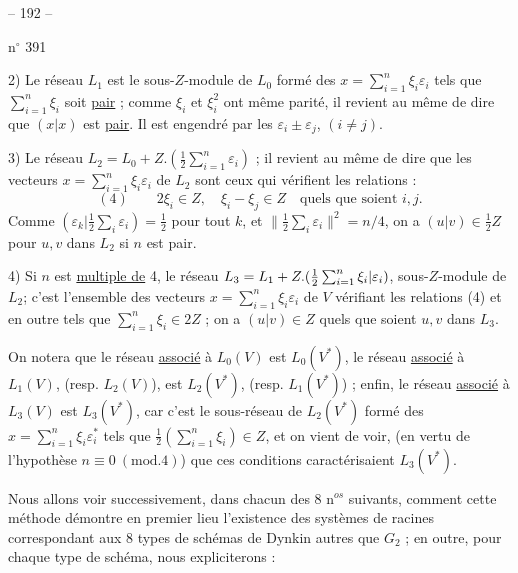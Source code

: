 
\begin{center}-- 192 --\end{center}
\hfill n$^{\circ}$ 391

2) Le réseau $L_1$ est le sous-$Z$-module de $L_0$ formé des $x=\sum_{i=1}^n\xi_i\varepsilon_i$ tels que
$\sum_{i=1}^n\xi_i$ soit \uline{pair} ; comme $\xi_i$ et $\xi_i^2$ ont même parité, il revient au même de dire
que $(x|x)$ est \uline{pair}. Il est engendré par les $\varepsilon_i\pm\varepsilon_j$, $(i\ne j)$.

3) Le réseau $L_2=L_0+Z.(\frac12\sum_{i=1}^n\varepsilon_i)$ ; il revient au même de dire que les vecteurs
$x=\sum_{i=1}^n\xi_i\varepsilon_i$ de $L_2$ sont ceux qui vérifient les relations :
\[
(4)\qquad 2\xi_i\in Z,\quad \xi_i-\xi_j\in Z\quad\text{quels que soient }i,j.
\]
Comme $(\varepsilon_k|\frac12\sum_i\varepsilon_i)=\frac12$ pour tout $k$, et
$\|\frac12\sum_i\varepsilon_i\|^2=n/4$, on a $(u|v)\in\frac12 Z$
pour $u,v$ dans $L_2$ si $n$ est pair.

4) Si $n$ est \uline{multiple de} 4, le réseau $L_3=L_1+Z.(\frac12\sum_{i=1}^n{\xi_i|\varepsilon_i})$, sous-$Z$-module de $L_2$;
c'est l'ensemble des vecteurs $x=\sum_{i=1}^n\xi_i\varepsilon_i$ de $V$ vérifiant les relations (4) et
en outre tels que $\sum_{i=1}^n\xi_i\in 2Z$ ; on a $(u|v)\in Z$ quels que soient $u,v$ dans $L_3$.

On notera que le réseau \uline{associé} à $L_0(V)$ est $L_0(V^*)$, le réseau \uline{associé}
à $L_1(V)$, (resp. $L_2(V)$), est $L_2(V^*)$, (resp. $L_1(V^*)$) ; enfin, le réseau \uline{associé}
à $L_3(V)$ est $L_3(V^*)$, car c'est le sous-réseau de $L_2(V^*)$ formé des $x=\sum_{i=1}^n\xi_i\varepsilon_i^*$
tels que $\frac12(\sum_{i=1}^n\xi_i)\in Z$, et on vient de voir, (en vertu de l'hypothèse $n\equiv0\ (\mathrm{mod}.4)$)
que ces conditions caractérisaient $L_3(V^*)$.

Nous allons voir successivement, dans chacun des 8 n$^{os}$ suivants, comment
cette méthode démontre en premier lieu l'existence des systèmes de racines
correspondant aux 8 types de schémas de Dynkin autres que $G_2$ ; en outre, pour
chaque type de schéma, nous expliciterons :

